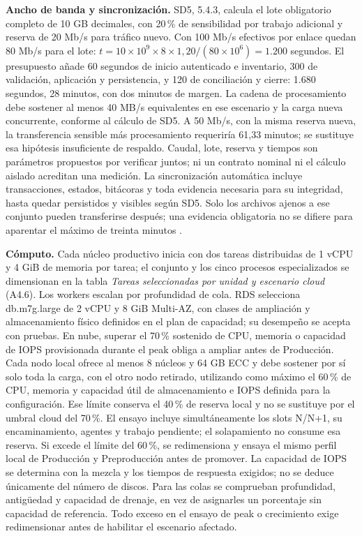 \textbf{Ancho de banda y sincronización.} SD5, 5.4.3, calcula el lote obligatorio completo de 10 GB decimales, con 20\,\% de sensibilidad por trabajo adicional y reserva de 20 Mb/s para tráfico nuevo. Con 100 Mb/s efectivos por enlace quedan 80 Mb/s para el lote: $t=10\times10^9\times8\times1,20/(80\times10^6)=1.200$ segundos. El presupuesto añade 60 segundos de inicio autenticado e inventario, 300 de validación, aplicación y persistencia, y 120 de conciliación y cierre: 1.680 segundos, 28 minutos, con dos minutos de margen. La cadena de procesamiento debe sostener al menos 40 MB/s equivalentes en ese escenario y la carga nueva concurrente, conforme al cálculo de SD5. A 50 Mb/s, con la misma reserva nueva, la transferencia sensible más procesamiento requeriría 61,33 minutos; se sustituye esa hipótesis insuficiente de respaldo. Caudal, lote, reserva y tiempos son parámetros propuestos por verificar juntos; ni un contrato nominal ni el cálculo aislado acreditan una medición. La sincronización automática incluye transacciones, estados, bitácoras y toda evidencia necesaria para su integridad, hasta quedar persistidos y visibles según SD5. Solo los archivos ajenos a ese conjunto pueden transferirse después; una evidencia obligatoria no se difiere para aparentar el máximo de treinta minutos \parencite[cap.~15, RT-03.13]{caso07}.



\textbf{Cómputo.} Cada núcleo productivo inicia con dos tareas distribuidas de 1 vCPU y 4 GiB de memoria por tarea; el conjunto y los cinco procesos especializados se dimensionan en la tabla \emph{Tareas seleccionadas por unidad y escenario cloud} (A4.6). Los workers escalan por profundidad de cola. RDS selecciona db.m7g.large de 2 vCPU y 8 GiB Multi-AZ, con clases de ampliación y almacenamiento físico definidos en el plan de capacidad; su desempeño se acepta con pruebas. En nube, superar el 70\,\% sostenido de CPU, memoria o capacidad de IOPS provisionada durante el peak obliga a ampliar antes de Producción. Cada nodo local ofrece al menos 8 núcleos y 64 GB ECC y debe sostener por sí solo toda la carga, con el otro nodo retirado, utilizando como máximo el 60\,\% de CPU, memoria y capacidad útil de almacenamiento e IOPS definida para la configuración. Ese límite conserva el 40\,\% de reserva local y no se sustituye por el umbral cloud del 70\,\%. El ensayo incluye simultáneamente los slots N/N+1, su encaminamiento, agentes y trabajo pendiente; el solapamiento no consume esa reserva. Si excede el límite del 60\,\%, se redimensiona y ensaya el mismo perfil local de Producción y Preproducción antes de promover. La capacidad de IOPS se determina con la mezcla y los tiempos de respuesta exigidos; no se deduce únicamente del número de discos. Para las colas se comprueban profundidad, antigüedad y capacidad de drenaje, en vez de asignarles un porcentaje sin capacidad de referencia. Todo exceso en el ensayo de peak o crecimiento exige redimensionar antes de habilitar el escenario afectado.

